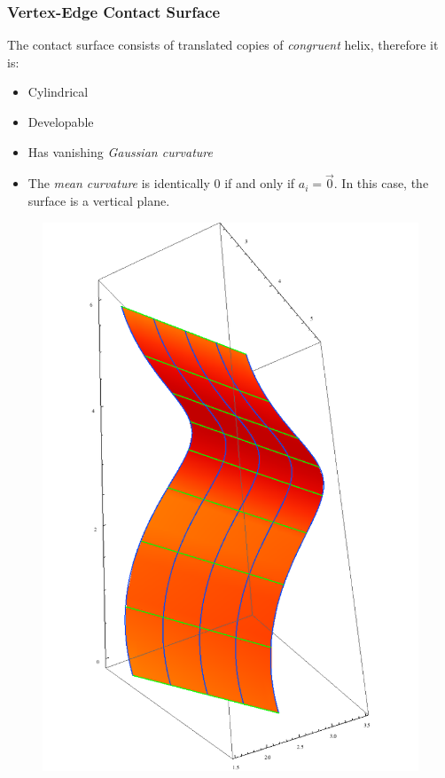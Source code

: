 \documentclass[ucs,9pt,pagenumbersfull]{beamer}
\begin{document}
\begin{frame}
  \frametitle{Vertex-Edge Contact Surface}
  \begin{minipage}{0.63\linewidth}
    The contact surface consists of translated copies of \emph{congruent}
    helix, therefore it is:
    \begin{itemize}
    \item Cylindrical
    \item Developable
    \item Has vanishing \emph{Gaussian curvature}
    \item The \emph{mean curvature} is identically \(0\) if and only if \(a_i = \vec{0}\). In this case, the surface is a vertical plane.
    \end{itemize}
  \end{minipage}
  \hfill
  \begin{minipage}{0.35\linewidth}
    \begin{figure}
      \centering
      \includegraphics[height=0.9\textheight]{Figures/ve-full-contact}
    \end{figure}
  \end{minipage}
\end{frame}
\end{document}
